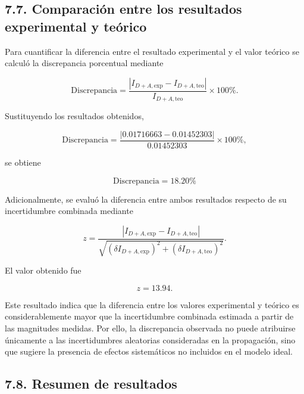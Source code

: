 \documentclass[11pt,a4paper]{article}
\begin{document}

\subsection*{7.7. Comparación entre los resultados experimental y teórico}

Para cuantificar la diferencia entre el resultado experimental y el
valor teórico se calculó la discrepancia porcentual mediante

\begin{equation}
\text{Discrepancia}=
\frac{
\left|
I_{D+A,\mathrm{exp}}-I_{D+A,\mathrm{teo}}
\right|
}{
I_{D+A,\mathrm{teo}}
}
\times100\%.
\label{eq:discrepancia}
\end{equation}

Sustituyendo los resultados obtenidos,

\[
\text{Discrepancia}
=
\frac{
|0.01716663-0.01452303|
}{
0.01452303
}
\times100\%,
\]

se obtiene

\begin{equation}
\boxed{
\text{Discrepancia}=18.20\%
}
\end{equation}

Adicionalmente, se evaluó la diferencia entre ambos resultados respecto
de su incertidumbre combinada mediante

\[
z=
\frac{
\left|
I_{D+A,\mathrm{exp}}-I_{D+A,\mathrm{teo}}
\right|
}{
\sqrt{
(\delta I_{D+A,\mathrm{exp}})^2+
(\delta I_{D+A,\mathrm{teo}})^2
}
}.
\]

El valor obtenido fue

\[
z=13.94.
\]

Este resultado indica que la diferencia entre los valores experimental
y teórico es considerablemente mayor que la incertidumbre combinada
estimada a partir de las magnitudes medidas. Por ello, la discrepancia
observada no puede atribuirse únicamente a las incertidumbres aleatorias
consideradas en la propagación, sino que sugiere la presencia de efectos
sistemáticos no incluidos en el modelo ideal.



\subsection*{7.8. Resumen de resultados}
\end{document}
